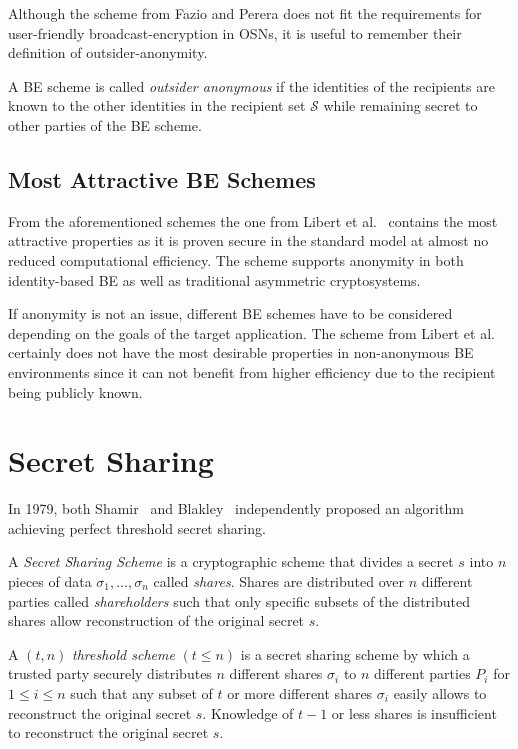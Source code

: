 Although the scheme from Fazio and Perera does not fit the requirements for user-friendly broadcast-encryption in OSNs, it is useful to remember their definition of outsider-anonymity.

\begin{defn}
\label{def:outsider_anonymity}
 A BE scheme is called \textit{outsider anonymous} if the identities of the recipients are known to the other identities in the recipient set $\mathcal{S}$ while remaining secret to other parties of the BE scheme.
\end{defn}

\subsection{Most Attractive BE Schemes}
From the aforementioned schemes the one from Libert et al.~\cite{art:LibertQ03} contains the most attractive properties as it is proven secure in the standard model at almost no reduced computational efficiency. The scheme supports anonymity in both identity-based BE as well as traditional asymmetric cryptosystems.

If anonymity is not an issue, different BE schemes have to be considered depending on the goals of the target application. The scheme from Libert et al.~\cite{art:LibertPQ12} certainly does not have the most desirable properties in non-anonymous BE environments since it can not benefit from higher efficiency due to the recipient being publicly known.

\section{Secret Sharing}
In 1979, both Shamir~\cite{art:Shamir79} and Blakley~\cite{art:Blakley79} independently proposed an algorithm achieving perfect threshold secret sharing.

\begin{defn}
\label{def:secret_sharing_scheme}
 A \textit{Secret Sharing Scheme} is a cryptographic scheme that divides a secret $s$ into $n$ pieces of data $\sigma_1, \ldots, \sigma_n$ called \textit{shares}. Shares are distributed over $n$ different parties called \textit{shareholders} such that only specific subsets of the distributed shares allow reconstruction of the original secret $s$.
\end{defn}

\begin{defn}
\label{def:threshold_scheme}
 A $\left( t, n \right)$ \textit{threshold scheme} $\left( t \leq n \right)$ is a secret sharing scheme by which a trusted party securely distributes $n$ different shares $\sigma_i$ to $n$ different parties $P_i$ for $1 \leq i \leq n$ such that any subset of $t$ or more different shares $\sigma_i$ easily allows to reconstruct the original secret $s$. Knowledge of $t-1$ or less shares is insufficient to reconstruct the original secret $s$.
\end{defn}

